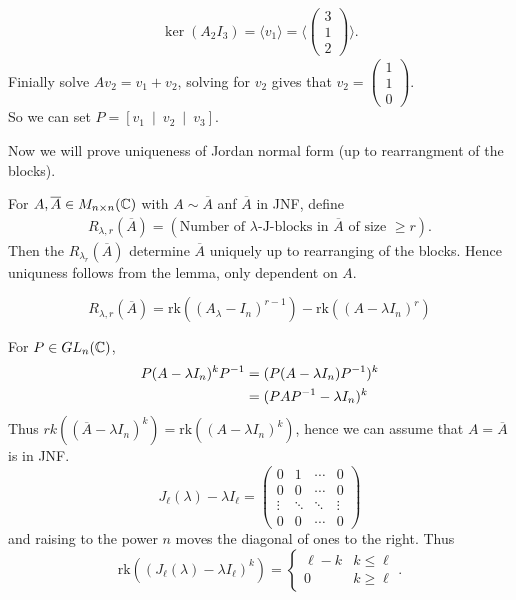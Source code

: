 \documentclass{article}
\newcommand{\rk}{\mathrm{rk}}
\begin{document}
\begin{align*}
  \ker(A_2I_3)=\langle v_1\rangle =\langle \begin{pmatrix}
	  3 \\ 1 \\ 2
  \end{pmatrix}\rangle.
\end{align*}
Finially solve $ Av_2=v_1+v_2 $, solving for $ v_2 $ gives that $ v_2=\begin{pmatrix}
  1 \\ 1\\ 0
\end{pmatrix}. $\\
So we can set $ P=[v_1 \ \mid \ v_2 \ \mid\  v_3 ]$.
\par
Now we will prove uniqueness of Jordan normal form (up to rearrangment of the blocks).\par
\pf For $ A,\overline A\in M_{n\times n}(\mathbb{C}) $ with $ A\sim \overline A $ anf $ \overline A $ in JNF, define
\begin{align*}
	R_{\lambda,r}(\overline A)= \left(\text{Number of }\lambda\text{-J-blocks in } \overline A\text { of size } \ge r\right).
\end{align*}
Then the $ R_{\lambda_r}(\overline A) $ determine $ \overline A $ uniquely up to rearranging of the blocks. Hence uniquness follows from the lemma, only dependent on $ A $.
\begin{lemma}
  \[
	  R_{\lambda,r}(\overline A)=\rk((A_\lambda -I_n)^{r-1})-\rk((A-\lambda I_n)^r)
  \]
\end{lemma}
\pf For $ P\in GL_n(\mathbb{C}) $,
\begin{align*}
	P(A-\lambda I_n)^k{P}^{-1} &= (P(A-\lambda I_n){P}^{-1})^k\\
				 &= (PA{P}^{-1}-\lambda I_n)^k
\end{align*}
Thus $ rk((\overline A-\lambda I_n)^k)=\rk((A-\lambda I_n)^k) $, hence we can assume that $ A=\overline A $ is in JNF.
\[
  J_\ell(\lambda)-\lambda I_\ell=\begin{pmatrix}
	  0 & 1 & \cdots & 0\\
	  0 &  0 & \cdots  & 0 \\
\vdots & \ddots & \ddots & \vdots \\
0 & 0 & \cdots &  0
  \end{pmatrix}
\]
and raising to the power $ n $ moves the diagonal of ones to the right. Thus
\[
  \rk((J_\ell(\lambda)-\lambda I_\ell)^k)=\begin{cases}
	  \ell - k & k\le \ell \\
	  0 & k\ge \ell
  \end{cases}.
\]
\end{document}

